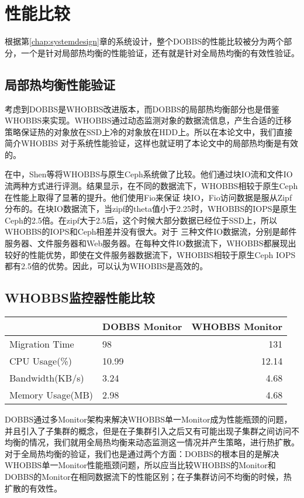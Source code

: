 \section{性能比较}
根据第\ref{chap:systemdesign}章的系统设计，整个DOBBS的性能比较被分为两个部分，一个是针对局部热均衡的性能验证，还有就是针对全局热均衡的有效性验证。

\subsection{局部热均衡性能验证}
考虑到DOBBS是WHOBBS改进版本，而DOBBS的局部热均衡部分也是借鉴WHOBBS来实现。WHOBBS通过动态监测对象的数据流信息，产生合适的迁移策略保证热的对象放在SSD上冷的对象放在HDD上。所以在本论文中，我们直接简介WHOBBS
对于系统性能验证，这样也就证明了本论文中的局部热均衡是有效的。

在中，Shen等将WHOBBS与原生Ceph系统做了比较。他们通过块IO流和文件IO流两种方式进行评测。结果显示，在不同的数据流下，WHOBBS相较于原生Ceph在性能上取得了显著的提升。他们使用Fio来保证
块IO，Fio访问数据是服从Zipf分布的。在块IO数据流下，当zipf的theta值小于2.25时，WHOBBS的IOPS是原生Ceph的2.5倍。在zipf大于2.5后，这个时候大部分数据已经位于SSD上，所以WHOBBS的IOPS和Ceph相差并没有很大。对于
三种文件IO数据流，分别是邮件服务器、文件服务器和Web服务器。在每种文件IO数据流下，WHOBBS都展现出较好的性能优势，即使在文件服务器数据流下，WHOBBS相较于原生Ceph IOPS都有2.5倍的优势。因此，可以认为WHOBBS是高效的。

\subsection{WHOBBS监控器性能比较}
\begin{table}[!hpb]
    \centering
    \begin{tabular}{@{}llr@{}} \toprule
       & DOBBS Monitor & WHOBBS Monitor\\ \midrule
      Migration Time & 98 & 131 \\
      CPU Usage(\%) & 10.99 & 12.14 \\
      Bandwidth(KB/s) & 3.24 & 4.68 \\
      Memory Usage(MB) & 2.98 & 4.68 \\
    \end{tabular}
\end{table}

DOBBS通过多Monitor架构来解决WHOBBS单一Monitor成为性能瓶颈的问题，并且引入了子集群的概念，但是在子集群引入之后又有可能出现子集群之间访问不均衡的情况，我们就用全局热均衡来动态监测这一情况并产生策略，进行热扩散。
对于全局热均衡的验证，我们也是通过两个方面：DOBBS的根本目的是解决WHOBBS单一Monitor性能瓶颈问题，所以应当比较WHOBBS的Monitor和DOBBS的Monitor在相同数据流下的性能区别；在子集群访问不均衡的时候，热扩散的有效性。

